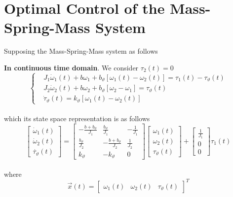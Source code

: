\documentclass[11pt,a4paper,oneside]{book}
\numberwithin{equation}{section}
\theoremstyle{it}
\theoremstyle{definition}
\begin{document}
\section{Optimal Control of the Mass-Spring-Mass System}
Supposing the Mass-Spring-Mass system as follows
\begin{mybox}
	\textbf{In continuous time domain}. We consider $\tau_2(t)=0$
	\begin{equation*}\label{two_mass_1}
		\left\lbrace 
		\begin{aligned}
			& J_1 \dot{\omega}_1(t) + b\omega_1+b_{\vartheta}\left[ 
			\omega_1(t)-\omega_2(t)\right] = \tau_1(t) - \tau_{\vartheta}(t) 
			\\[6pt]
			& J_2 \dot{\omega}_2(t) + b\omega_2+b_{\vartheta}\left[ 
			\omega_2-\omega_1\right] = \tau_{\vartheta}(t) \\[6pt]
			& \dot{\tau}_{\vartheta}(t) = k_{\vartheta}\left[  
			\omega_1(t)-\omega_2(t)\right]  
		\end{aligned}
		\right. 
	\end{equation*}\\
	which its state space representation is as follows
	\begin{equation*}\label{two_mass_2}
		\begin{bmatrix}
			\dot{\omega}_1(t) \\[6pt]
			\dot{\omega}_2(t) \\[6pt]
			\dot{\tau_{\vartheta}}(t)
		\end{bmatrix} = 
		\begin{bmatrix}
			-\frac{b+b_{\vartheta}}{J_1} & \frac{b_{\vartheta}}{J_1} & 
			-\frac{1}{J_1}\\[6pt]
			\frac{b_{\vartheta}}{J_2} & -\frac{b+b_{\vartheta}}{J_2} & 
			\frac{1}{J_2}\\[6pt]
			k_{\vartheta} & -k_{\vartheta} & 0
		\end{bmatrix}
		\begin{bmatrix}
			{\omega_1}(t) \\[6pt]
			{\omega_2}(t) \\[6pt]
			{\tau_{\vartheta}}(t)
		\end{bmatrix} + 
		\begin{bmatrix}
			\frac{1}{J_1} \\[6pt]
			0 \\[6pt]
			0
		\end{bmatrix} \tau_1(t)
	\end{equation*}\\
	where 
	\begin{equation*}
		\vec{x}(t) = \left[\begin{matrix} 
			\omega_1(t)&\omega_2(t)&\tau_{\vartheta}(t) \end{matrix} \right]^T
	\end{equation*}
	

\end{mybox}
\end{document}
